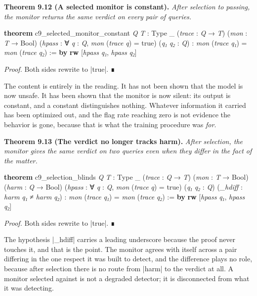 \documentclass{memoir}
\begin{document}
\textbf{Theorem 9.12 (A selected monitor is constant).} \emph{After selection to passing, the
monitor returns the same verdict on every pair of queries.}

\begin{LeanVerbatim}
\textbf{theorem} c9_selected_monitor_constant \textit{Q} \textit{T} : Type _
    (\textit{trace} : \textit{Q} → \textit{T}) (\textit{mon} : \textit{T} → Bool)
    (\textit{hpass} : ∀ \textit{q} : \textit{Q}, \textit{mon} (\textit{trace} \textit{q}) = true) (\textit{q₁} \textit{q₂} : \textit{Q}) :
    \textit{mon} (\textit{trace} \textit{q₁}) = \textit{mon} (\textit{trace} \textit{q₂}) := \textbf{by}
  \textbf{rw} [\textit{hpass} \textit{q₁}, \textit{hpass} \textit{q₂}]

\end{LeanVerbatim}


\emph{Proof.} Both sides rewrite to \LeanVerb|true|. ∎

The content is entirely in the reading. It has not been shown that the model is
now unsafe. It has been shown that the monitor is now silent: its output is
constant, and a constant distinguishes nothing. Whatever information it carried
has been optimized out, and the flag rate reaching zero is not evidence the
behavior is gone, because that is what the training procedure was \emph{for}.

\textbf{Theorem 9.13 (The verdict no longer tracks harm).} \emph{After selection, the monitor gives
the same verdict on two queries even when they differ in the fact of the
matter.}

\begin{LeanVerbatim}
\textbf{theorem} c9_selection_blinds \textit{Q} \textit{T} : Type _
    (\textit{trace} : \textit{Q} → \textit{T}) (\textit{mon} : \textit{T} → Bool) (\textit{harm} : \textit{Q} → Bool)
    (\textit{hpass} : ∀ \textit{q} : \textit{Q}, \textit{mon} (\textit{trace} \textit{q}) = true)
    (\textit{q₁} \textit{q₂} : \textit{Q}) (\textit{_hdiff} : \textit{harm} \textit{q₁} ≠ \textit{harm} \textit{q₂}) :
    \textit{mon} (\textit{trace} \textit{q₁}) = \textit{mon} (\textit{trace} \textit{q₂}) := \textbf{by}
  \textbf{rw} [\textit{hpass} \textit{q₁}, \textit{hpass} \textit{q₂}]

\end{LeanVerbatim}


\emph{Proof.} Both sides rewrite to \LeanVerb|true|. ∎

The hypothesis \LeanVerb|_hdiff| carries a leading underscore because the proof never
touches it, and that is the point. The monitor agrees with itself across a pair
differing in the one respect it was built to detect, and the difference plays no
role, because after selection there is no route from \LeanVerb|harm| to the verdict at
all. A monitor selected against is not a degraded detector; it is disconnected
from what it was detecting.
\end{document}
